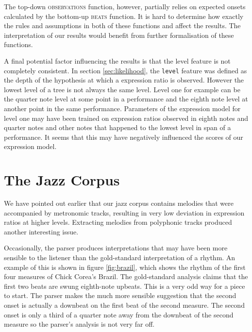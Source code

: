 The top-down \textsc{observations} function, however, partially relies on expected onsets calculated by the bottom-up \textsc{beats} function. It is hard to determine how exactly the rules and assumptions in both of these functions and affect the results. The interpretation of our results would benefit from further formalisation of these functions.

A final potential factor influencing the results is that the level feature is not completely consistent. In section \ref{sec:likelihood}, the \texttt{level} feature was defined as the depth of the hypothesis at which a expression ratio is observed. However the lowest level of a tree is not always the same level. Level one for example can be the quarter note level at some point in a performance and the eighth note level at another point in the same performance. Parameters of the expression model for level one may have been trained on expression ratios observed in eighth notes and quarter notes and other notes that happened to the lowest level in span of a performance. It seems that this may have negatively influenced the scores of our expression model. 

\section{The Jazz Corpus}

We have pointed out earlier that our jazz corpus contains melodies that were accompanied by metronomic tracks, resulting in very low deviation in expression ratios at higher levels. Extracting melodies from polyphonic tracks produced another interesting issue.

Occasionally, the parser produces interpretations that may have been more sensible to the listener than the gold-standard interpretation of a rhythm. An example of this is shown in figure \ref{fig:brazil}, which shows the rhythm of the first four measures of Chick Corea's Brazil. The gold-standard analysis claims that the first two beats are swung eighth-note upbeats. This is a very odd way for a piece to start. The parser makes the much more sensible suggestion that the second onset is actually a downbeat on the first beat of the second measure. The second onset is only a third of a quarter note away from the downbeat of the second measure so the parser's analysis is not very far off. 

